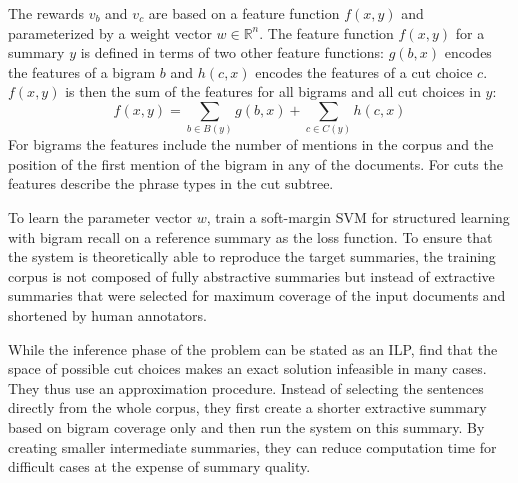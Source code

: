 \documentclass[a4paper,BCOR=10mm]{report}
\numberwithin{lemma}{chapter}
\numberwithin{definition}{chapter}
\begin{document}
The rewards $v_b$ and $v_c$ are based on a feature function $f(x, y)$ and parameterized by a weight vector $w \in \mathbb{R}^n$.
The feature function $f(x, y)$ for a summary $y$ is defined in terms of two other feature functions: $g(b, x)$ encodes the features of a bigram $b$ and $h(c, x)$ encodes the features of a cut choice $c$. $f(x, y)$ is then the sum of the features for all bigrams and all cut choices in $y$:
\begin{equation}
f(x, y) = \sum_{b \in B(y)} g(b, x) + \sum_{c \in C(y)} h(c, x)
\end{equation}
For bigrams the features include the number of mentions in the corpus and the position of the first mention of the bigram in any of the documents.
For cuts the features describe the phrase types in the cut subtree.

To learn the parameter vector $w$, \citeauthor{berg-kirkpatrick} train a soft-margin SVM for structured learning \citep{svm} with bigram recall on a reference summary as the loss function. To ensure that the system is theoretically able to reproduce the target summaries, the training corpus is not composed of fully abstractive summaries but instead of extractive summaries that were selected for maximum coverage of the input documents and shortened by human annotators.

While the inference phase of the problem can be stated as an ILP, \citet{berg-kirkpatrick} find that the space of possible cut choices makes an exact solution infeasible in many cases. They thus use an approximation procedure. Instead of selecting the sentences directly from the whole corpus, they first create a shorter extractive summary based on bigram coverage only and then run the system on this summary. By creating smaller intermediate summaries, they can reduce computation time for difficult cases at the expense of summary quality.




\end{document}
